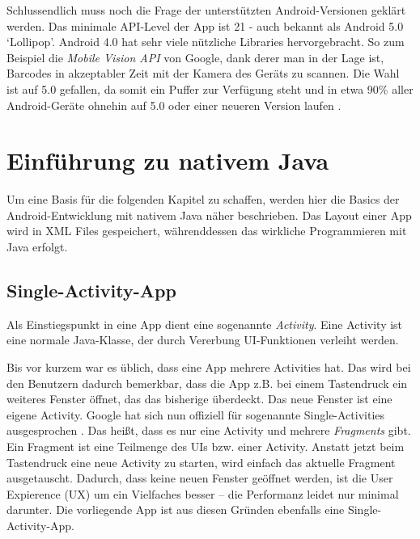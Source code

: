 Schlussendlich muss noch die Frage der unterstützten Android-Versionen
geklärt werden. Das minimale API-Level der App ist 21 - auch bekannt als
Android 5.0 `Lollipop'. Android 4.0 hat sehr viele nützliche Libraries
hervorgebracht. So zum Beispiel die \emph{Mobile Vision API} von Google,
dank derer man in der Lage ist, Barcodes in akzeptabler Zeit mit der
Kamera des Geräts zu scannen. Die Wahl ist auf 5.0 gefallen, da somit
ein Puffer zur Verfügung steht und in etwa 90\% aller Android-Geräte
ohnehin auf 5.0 oder einer neueren Version laufen
\cite{android-versions-market-share}.

\hypertarget{einfuxfchrung-zu-nativem-java}{%
\section{Einführung zu nativem
Java}\label{einfuxfchrung-zu-nativem-java}}

Um eine Basis für die folgenden Kapitel zu schaffen, werden hier die
Basics der Android-Entwicklung mit nativem Java näher beschrieben. Das
Layout einer App wird in XML Files gespeichert, währenddessen das
wirkliche Programmieren mit Java erfolgt.

\hypertarget{single-activity-app}{%
\subsection{Single-Activity-App}\label{single-activity-app}}

Als Einstiegspunkt in eine App dient eine sogenannte \emph{Activity}.
Eine Activity ist eine normale Java-Klasse, der durch Vererbung
UI-Funktionen verleiht werden.

Bis vor kurzem war es üblich, dass eine App mehrere Activities hat. Das
wird bei den Benutzern dadurch bemerkbar, dass die App z.B. bei einem
Tastendruck ein weiteres Fenster öffnet, das das bisherige überdeckt.
Das neue Fenster ist eine eigene Activity. Google hat sich nun offiziell
für sogenannte Single-Activities ausgesprochen \cite{single-activity}.
Das heißt, dass es nur eine Activity und mehrere \emph{Fragments} gibt.
Ein Fragment ist eine Teilmenge des UIs bzw. einer Activity. Anstatt
jetzt beim Tastendruck eine neue Activity zu starten, wird einfach das
aktuelle Fragment ausgetauscht. Dadurch, dass keine neuen Fenster
geöffnet werden, ist die User Expierence (UX) um ein Vielfaches besser
-- die Performanz leidet nur minimal darunter. Die vorliegende App ist
aus diesen Gründen ebenfalls eine Single-Activity-App.

